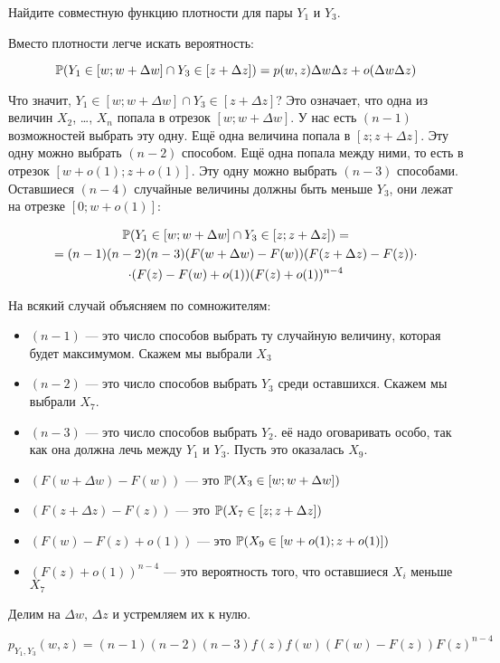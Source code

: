 \begin{myex}
Найдите совместную функцию плотности для пары  $ Y_{1} $ и $ Y_{3} $.

Вместо плотности легче искать вероятность:

\begin{equation}
 \P(Y_{1}\in [w;w+\Delta w] \cap Y_{3} \in [z+\Delta z] )=p(w,z)\Delta w\Delta z+o(\Delta w \Delta z)
\end{equation}


Что значит, $ Y_{1} \in [w;w+\Delta w] \cap Y_{3} \in [z+\Delta z]$? Это означает, что одна из величин $ X_{2} $, \ldots, $ X_{n} $ попала в отрезок $ [w;w+\Delta w] $. У нас есть $ (n-1) $ возможностей выбрать эту одну. Ещё одна величина попала в $ [z;z+\Delta z] $. Эту одну можно выбрать $ (n-2) $ способом. Ещё одна попала между ними, то есть в отрезок $ [w+o(1);z+o(1)] $. Эту одну можно выбрать $(n-3)$ способами. Оставшиеся $ (n-4) $ случайные величины должны быть меньше $ Y_{3} $, они лежат на отрезке $ [0;w+o(1)] $:

\begin{multline}
\P(Y_{1}\in [w;w+\Delta w] \cap Y_{3}\in [z;z+\Delta z] ) =\\
= (n-1)(n-2)(n-3) (F(w+\Delta w)-F(w)) (F(z+\Delta z)-F(z))\cdot \\
\cdot (F(z)-F(w)+o(1)) (F(z)+o(1))^{n-4}
\end{multline}

На всякий случай объясняем по сомножителям:
\begin{itemize}
\item $(n-1)  $ — это число способов выбрать ту случайную величину, которая будет максимумом. Скажем мы выбрали $ X_{3} $
\item $ (n-2) $ — это число способов выбрать $ Y_{3} $ среди оставшихся. Скажем мы выбрали $ X_{7} $.
\item $ (n-3) $ — это число способов выбрать $ Y_{2} $. её надо оговаривать особо, так как она должна лечь между $ Y_{1} $ и $ Y_{3} $. Пусть это оказалась $ X_{9} $.
\item $(F(w+\Delta w)-F(w))$ — это $ \P(X_{3}\in [w;w+\Delta w]) $
\item $(F(z+\Delta z)-F(z))$ — это $ \P(X_{7}\in [z;z+\Delta z] ) $
\item $(F(w)-F(z)+o(1))$ — это $ \P(X_{9}\in [w+o(1);z+o(1)] ) $
\item $ (F(z)+o(1))^{n-4} $ — это вероятность того, что оставшиеся $ X_{i} $ меньше $ X_{7} $
\end{itemize}

Делим на $ \Delta w $, $ \Delta z $ и устремляем их к нулю.

\begin{equation}
p_{Y_{1},Y_{3}}(w,z)=(n-1)(n-2)(n-3)f(z)f(w)(F(w)-F(z))F(z)^{n-4}
\end{equation}

\end{myex}










